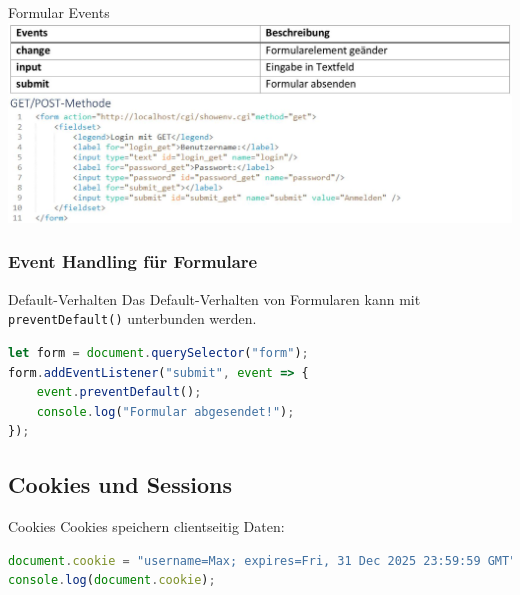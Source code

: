 Formular Events\\
\includegraphics[width=\linewidth]{images/2024_12_29_858f09cde51177c71657g-30}

\subsubsection{Event Handling für Formulare}
\begin{definition}{Default-Verhalten}
Das Default-Verhalten von Formularen kann mit \texttt{preventDefault()} unterbunden werden.
\begin{lstlisting}[language=JavaScript, style=basesmol]
let form = document.querySelector("form");
form.addEventListener("submit", event => {
    event.preventDefault();
    console.log("Formular abgesendet!");
});
\end{lstlisting}
\end{definition}

\pagebreak

\subsection{Cookies und Sessions}

\begin{definition}{Cookies}
Cookies speichern clientseitig Daten:
\begin{lstlisting}[language=JavaScript, style=basesmol]
document.cookie = "username=Max; expires=Fri, 31 Dec 2025 23:59:59 GMT";
console.log(document.cookie);
\end{lstlisting}
\end{definition}



